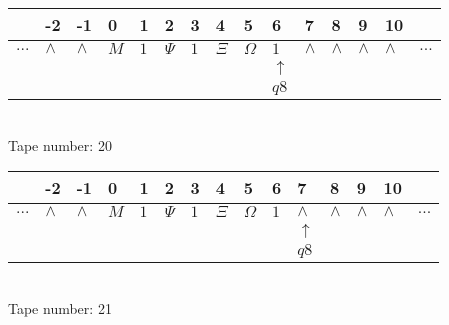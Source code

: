 \documentclass{article}
\begin{document}
\begin{table}[H]
\centering
\begin{tabular}{lllllllllllllll}
 & -2 & -1 & 0 & 1 & 2 & 3 & 4 & 5 & 6 & 7 & 8 & 9 & 10 & \\
\hline
$...$ & \multicolumn{1}{|l|}{$\wedge$} & \multicolumn{1}{|l|}{$\wedge$} & \multicolumn{1}{|l|}{$M$} & \multicolumn{1}{|l|}{$1$} & \multicolumn{1}{|l|}{$\Psi$} & \multicolumn{1}{|l|}{$1$} & \multicolumn{1}{|l|}{$\Xi$} & \multicolumn{1}{|l|}{$\Omega$} & \multicolumn{1}{|l|}{$1$} & \multicolumn{1}{|l|}{$\wedge$} & \multicolumn{1}{|l|}{$\wedge$} & \multicolumn{1}{|l|}{$\wedge$} & \multicolumn{1}{|l|}{$\wedge$} & $...$\\
\hline
&  &  &  &  &  &  &  &  & $\uparrow$ &  &  &  &  &  \\
&  &  &  &  &  &  &  &  & $ q8 $ &  &  &  &  &  \\
\end{tabular}
\\
Tape number: 20
\noindent\makebox[\linewidth]{\hdashrule{\textwidth}{1pt}{1pt}}\end{table}
\clearpage

\begin{table}[H]
\centering
\begin{tabular}{lllllllllllllll}
 & -2 & -1 & 0 & 1 & 2 & 3 & 4 & 5 & 6 & 7 & 8 & 9 & 10 & \\
\hline
$...$ & \multicolumn{1}{|l|}{$\wedge$} & \multicolumn{1}{|l|}{$\wedge$} & \multicolumn{1}{|l|}{$M$} & \multicolumn{1}{|l|}{$1$} & \multicolumn{1}{|l|}{$\Psi$} & \multicolumn{1}{|l|}{$1$} & \multicolumn{1}{|l|}{$\Xi$} & \multicolumn{1}{|l|}{$\Omega$} & \multicolumn{1}{|l|}{$1$} & \multicolumn{1}{|l|}{$\wedge$} & \multicolumn{1}{|l|}{$\wedge$} & \multicolumn{1}{|l|}{$\wedge$} & \multicolumn{1}{|l|}{$\wedge$} & $...$\\
\hline
&  &  &  &  &  &  &  &  &  & $\uparrow$ &  &  &  &  \\
&  &  &  &  &  &  &  &  &  & $ q8 $ &  &  &  &  \\
\end{tabular}
\\
Tape number: 21
\noindent\makebox[\linewidth]{\hdashrule{\textwidth}{1pt}{1pt}}\end{table}
\end{document}

